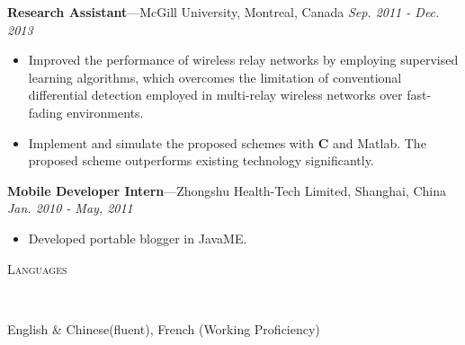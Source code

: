 \documentclass[11pt]{article}
\newenvironment{changemargin}[2]{%
  \begin{list}{}{%
    \setlength{\topsep}{0pt}%
    \setlength{\leftmargin}{#1}%
    \setlength{\rightmargin}{#2}%
    \setlength{\listparindent}{\parindent}%
    \setlength{\itemindent}{\parindent}%
    \setlength{\parsep}{\parskip}%
  }%
  \item[]}{\end{list}
}
\newcommand{\lineover}{
	\begin{changemargin}{-0.05in}{-0.05in}
		\vspace*{-8pt}
		\hrulefill \\
		\vspace*{-2pt}
	\end{changemargin}
}
\newcommand{\header}[1]{
	\begin{changemargin}{-0.5in}{-0.5in}
		\scshape{#1}\\
  	\lineover
	\end{changemargin}
}
\newenvironment{body} {
	\vspace*{-16pt}
	\begin{changemargin}{-0.25in}{-0.5in}
  }	
	{\end{changemargin}
}
\begin{document}
\begin{body}
	\textbf{Research Assistant}---McGill University, Montreal, Canada  \hfill \emph{Sep. 2011 - Dec. 2013}\\
	\vspace*{-4pt}
	\begin{itemize} \itemsep -0pt  %
\item Improved the performance of wireless relay networks by employing supervised learning algorithms, which overcomes the limitation of conventional differential detection employed in multi-relay wireless networks over fast-fading environments.
\item Implement and simulate the proposed schemes with \textbf{C} and Matlab. The proposed scheme outperforms existing technology significantly.
	\end{itemize}
	
	\textbf{Mobile Developer Intern}---Zhongshu Health-Tech Limited, Shanghai, China \hfill \emph{Jan. 2010 - May, 2011}\\
	\begin{itemize} \itemsep -0pt  %
		\item Developed portable blogger in JavaME.
	\end{itemize}
\end{body}
\smallskip

\header{Languages}
\begin{body}
	\vspace{14pt}
	English \& Chinese(fluent), French (Working Proficiency)\\
\end{body}
\smallskip
\end{document}

